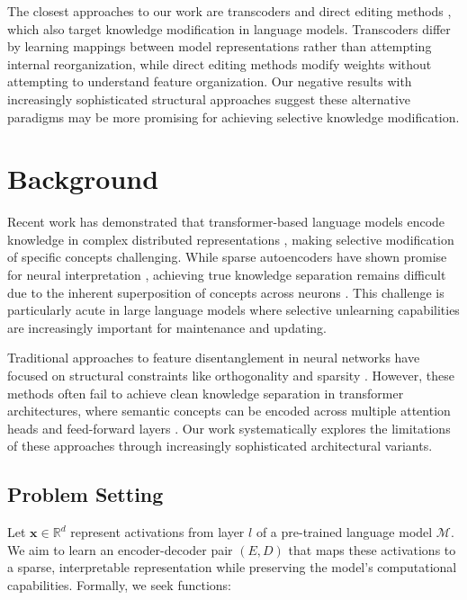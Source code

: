 \documentclass{article} %
\begin{document}
The closest approaches to our work are transcoders \cite{Dunefsky2024TranscodersFI} and direct editing methods \cite{Cao2021EditingFK}, which also target knowledge modification in language models. Transcoders differ by learning mappings between model representations rather than attempting internal reorganization, while direct editing methods modify weights without attempting to understand feature organization. Our negative results with increasingly sophisticated structural approaches suggest these alternative paradigms may be more promising for achieving selective knowledge modification.

\section{Background}
\label{sec:background}

Recent work has demonstrated that transformer-based language models encode knowledge in complex distributed representations \cite{Elhage2022ToyMO}, making selective modification of specific concepts challenging. While sparse autoencoders have shown promise for neural interpretation \cite{Cunningham2023SparseAF}, achieving true knowledge separation remains difficult due to the inherent superposition of concepts across neurons \cite{Elhage2022ToyMO}. This challenge is particularly acute in large language models where selective unlearning capabilities are increasingly important for maintenance and updating.

Traditional approaches to feature disentanglement in neural networks have focused on structural constraints like orthogonality \cite{Bengio2007LearningDA} and sparsity \cite{Cunningham2023SparseAF}. However, these methods often fail to achieve clean knowledge separation in transformer architectures, where semantic concepts can be encoded across multiple attention heads and feed-forward layers \cite{vaswani2017attention}. Our work systematically explores the limitations of these approaches through increasingly sophisticated architectural variants.

\subsection{Problem Setting}
Let $\mathbf{x} \in \mathbb{R}^d$ represent activations from layer $l$ of a pre-trained language model $\mathcal{M}$. We aim to learn an encoder-decoder pair $(E,D)$ that maps these activations to a sparse, interpretable representation while preserving the model's computational capabilities. Formally, we seek functions:
\end{document}
